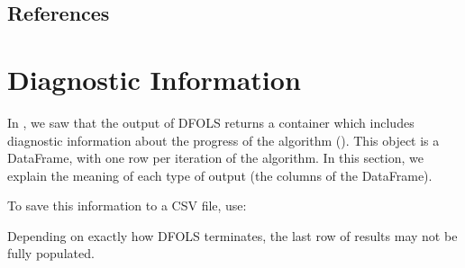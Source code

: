 \documentclass[letterpaper,10pt,english]{sphinxmanual}
\begin{document}
\section{References}
\label{\detokenize{advanced:references}}
\sphinxstepscope


\chapter{Diagnostic Information}
\label{\detokenize{diagnostic:diagnostic-information}}\label{\detokenize{diagnostic::doc}}
\sphinxAtStartPar
In {\hyperref[\detokenize{userguide::doc}]{}}, we saw that the output of DFO\sphinxhyphen{}LS returns a container which includes diagnostic information about the progress of the algorithm (). This object is a  DataFrame, with one row per iteration of the algorithm. In this section, we explain the meaning of each type of output (the columns of the DataFrame).

\sphinxAtStartPar
To save this information to a CSV file, use:
\begin{quote}

\begin{sphinxVerbatim}[commandchars=\\\{\}]

   

    

\end{sphinxVerbatim}
\end{quote}

\sphinxAtStartPar
Depending on exactly how DFO\sphinxhyphen{}LS terminates, the last row of results may not be fully populated.
\end{document}
